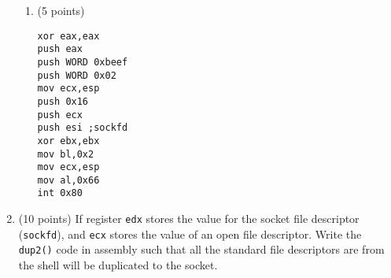 \documentclass{article}[9pt]
\begin{document}
\begin{enumerate}
\begin{enumerate}
\item (5 points)

\begin{verbatim}
xor eax,eax
push eax
push WORD 0xbeef
push WORD 0x02
mov ecx,esp
push 0x16
push ecx
push esi ;sockfd
xor ebx,ebx
mov bl,0x2
mov ecx,esp
mov al,0x66
int 0x80
\end{verbatim}
\end{enumerate}

\item (10 points) If register \texttt{edx} stores the value for the socket file
descriptor (\texttt{sockfd}), and \texttt{ecx} stores the value of an open file
descriptor. Write the \texttt{dup2()} code in assembly such that all the
standard file descriptors are from the shell will be duplicated
to the socket.
\end{enumerate}
\end{document}
